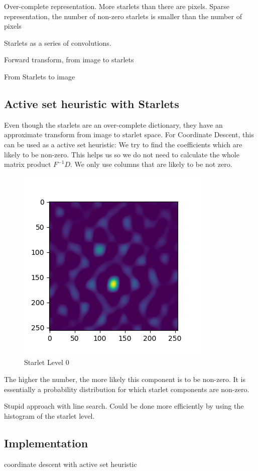 Over-complete representation. More starlets than there are pixels. Sparse representation, the number of non-zero starlets is smaller than the number of pixels

Starlets as a series of convolutions.

Forward transform, from image to starlets

From Starlets to image

\subsection{Active set heuristic with Starlets}\label{cd:heuristic}
Even though the starlets are an over-complete dictionary, they have an approximate transform from image to starlet space. For Coordinate Descent, this can be used as a active set heuristic: We try to find the coefficients which are likely to be non-zero. This helps us so we do not need to calculate the whole matrix product $F^{-1}D$. We only use columns that are likely to be not zero.

\begin{figure}[h]
	\centering
	\includegraphics[width=0.5\linewidth]{./chapters/05.algorithms/sim02/starlets0.png}
	\caption{Starlet Level 0}
	\label{alg:heuristic:starlet}
\end{figure}

The higher the number, the more likely this component is to be non-zero. It is essentially a probability distribution for which starlet components are non-zero.

Stupid approach with line search. Could be done more efficiently by using the histogram of the starlet level.

\subsection{Implementation}
coordinate descent with active set heuristic

